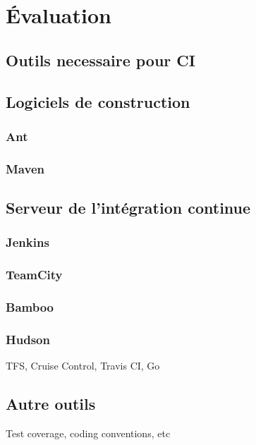 \chapter{Évaluation}
\label{eval}

\section{Outils necessaire pour CI}

\section{Logiciels de construction}

\subsection{Ant}

\subsection{Maven}

\section{Serveur de l'intégration continue}

\subsection{Jenkins}

\subsection{TeamCity}

\subsection{Bamboo}

\subsection{Hudson}

TFS, Cruise Control, Travis CI, Go

\section{Autre outils}

Test coverage, coding conventions, etc